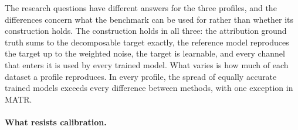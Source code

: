 \documentclass{article}
\begin{document}
The research questions have different answers for the three profiles, and the differences concern what the benchmark can be used for rather than whether its construction holds. The construction holds in all three: the attribution ground truth sums to the decomposable target exactly, the reference model reproduces the target up to the weighted noise, the target is learnable, and every channel that enters it is used by every trained model. What varies is how much of each dataset a profile reproduces. In every profile, the spread of equally accurate trained models exceeds every difference between methods, with one exception in MATR.

\paragraph{What resists calibration.}
\end{document}
